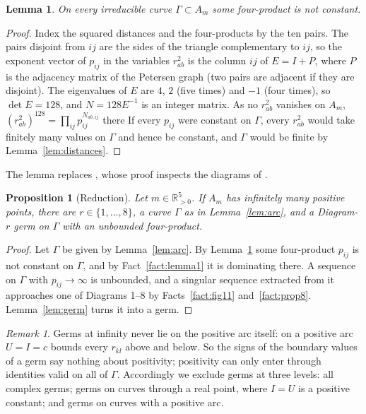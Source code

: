 \documentclass[11pt]{amsart}
\newtheorem{proposition}[theorem]{Proposition}
\newtheorem{lemma}[theorem]{Lemma}
\theoremstyle{definition}
\theoremstyle{remark}
\newtheorem{remark}[theorem]{Remark}
\newcommand{\Rp}{\mathbb{R}_{>0}}
\begin{document}
\begin{lemma}\label{lem:petersen}
On every irreducible curve $\Gamma\subset A_m$ some four-product is not constant.
\end{lemma}
\begin{proof}
Index the squared distances and the four-products by the ten pairs.  The pairs disjoint from
$ij$ are the sides of the triangle complementary to $ij$, so the exponent vector of $p_{ij}$ in
the variables $r_{ab}^2$ is the column $ij$ of $E=I+P$, where $P$ is the adjacency matrix of the
Petersen graph (two pairs are adjacent if they are disjoint).  The eigenvalues of $E$ are $4$,
$2$ (five times) and $-1$ (four times), so $\det E=128$, and $N=128E^{-1}$ is an integer
matrix.  As no $r_{ab}^2$ vanishes on $A_m$, $(r_{ab}^2)^{128}=\prod_{ij}p_{ij}^{N_{ab,ij}}$ there
If every $p_{ij}$ were constant on $\Gamma$, every $r_{ab}^2$ would take finitely many values on
$\Gamma$ and hence be constant, and $\Gamma$ would be finite by Lemma~\ref{lem:distances}.
\end{proof}
The lemma replaces \cite[Prop.~9]{AK}, whose proof inspects the diagrams of \cite[Fig.~11]{AK}.

\begin{proposition}[Reduction]\label{prop:reduction}
Let $m\in\Rp^5$.  If $A_m$ has infinitely many positive points, there are $r\in\{1,\dots,8\}$, a
curve $\Gamma$ as in Lemma~\ref{lem:arc}, and a Diagram-$r$ germ on $\Gamma$ with an unbounded
four-product.
\end{proposition}

\begin{proof}
Let $\Gamma$ be given by Lemma~\ref{lem:arc}.  By Lemma~\ref{lem:petersen} some four-product
$p_{ij}$ is not constant on $\Gamma$, and by Fact~\ref{fact:lemma1} it is dominating there.  A
sequence on $\Gamma$ with $p_{ij}\to\infty$ is unbounded, and a singular sequence extracted from
it approaches one of Diagrams 1--8 by Facts~\ref{fact:fig11} and~\ref{fact:prop8}.
Lemma~\ref{lem:germ} turns it into a germ.
\end{proof}

\begin{remark}\label{rem:levels}
Germs at infinity never lie on the positive arc itself: on a positive arc $U=I=c$ bounds every
$r_{kl}$ above and below.  So the signs of the boundary values of a germ say nothing about
positivity; positivity can only enter through identities valid on all of $\Gamma$.  Accordingly
we exclude germs at three levels: all complex germs; germs on curves through a real point,
where $I=U$ is a positive constant; and germs on curves with a positive arc.
\end{remark}
\end{document}
